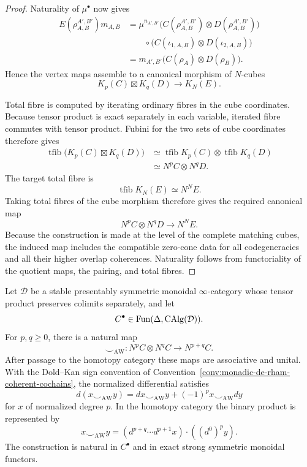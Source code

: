 \begin{proof}
Naturality of \(\mu^\bullet\) now gives
\[
\begin{aligned}
    E(\rho_{A,B}^{A',B'})m_{A,B}
    &=
    \mu^{n_{A',B'}}
    \bigl(
        C(\rho_{A,B}^{A',B'})
        \otimes
        D(\rho_{A,B}^{A',B'})
    \bigr)
    \\
    &\qquad\circ
    \bigl(
        C(\iota_{1,A,B})
        \otimes
        D(\iota_{2,A,B})
    \bigr)
    \\
    &=
    m_{A',B'}
    \bigl(
        C(\rho_A)\otimes D(\rho_B)
    \bigr).
\end{aligned}
\]
Hence the vertex maps assemble to a canonical morphism of \(N\)-cubes
\[
\boxed{
    K_p(C)\boxtimes K_q(D)
    \longrightarrow
    K_N(E).
}
\]

Total fibre is computed by iterating ordinary fibres in the cube coordinates.
Because tensor product is exact separately in each variable, iterated fibre
commutes with tensor product.  Fubini for the two sets of cube coordinates
therefore gives
\[
\begin{aligned}
    \operatorname{tfib}
    \bigl(
        K_p(C)\boxtimes K_q(D)
    \bigr)
    &\simeq
    \operatorname{tfib}K_p(C)
    \otimes
    \operatorname{tfib}K_q(D)
    \\
    &\simeq
    N^pC\otimes N^qD.
\end{aligned}
\]
The target total fibre is
\[
    \operatorname{tfib}K_N(E)
    \simeq
    N^NE.
\]
Taking total fibres of the cube morphism therefore gives the required
canonical map
\[
    N^pC\otimes N^qD
    \longrightarrow
    N^NE.
\]
Because the construction is made at the level of the complete matching cubes,
the induced map includes the compatible zero-cone data for all codegeneracies
and all their higher overlap coherences.  Naturality follows from functoriality
of the quotient maps, the pairing, and total fibres.
\end{proof}

\begin{proposition}
\label{prop:ordered-monoidal-stable-dold-kan}
Let \(\mathcal D\) be a stable presentably symmetric monoidal \(\infty\)-category whose tensor
product preserves colimits separately, and let
\[
    C^\bullet\in\operatorname{Fun}(\Delta,\operatorname{CAlg}(\mathcal D)).
\]
For \(p,q\geq0\), there is a natural map
\[
\boxed{
    \smile_{\mathrm{AW}}:
    N^pC\otimes N^qC
    \longrightarrow
    N^{p+q}C.
}
\]
After passage to the homotopy category these maps are associative and unital.  With the Dold--Kan
sign convention of Convention~\ref{conv:monadic-de-rham-coherent-cochains}, the normalized
differential satisfies
\[
\boxed{
    d(x\smile_{\mathrm{AW}}y)
    =
    dx\smile_{\mathrm{AW}}y
    +
    (-1)^p x\smile_{\mathrm{AW}}dy
}
\]
for \(x\) of normalized degree \(p\).  In the homotopy category the binary product is represented by
\[
\boxed{
    x\smile_{\mathrm{AW}}y
    =
    \left(
        d^{p+q}\cdots d^{p+1}x
    \right)
    \cdot
    \left(
        (d^0)^py
    \right).
}
\]
The construction is natural in \(C^\bullet\) and in exact strong symmetric monoidal functors.
\end{proposition}

